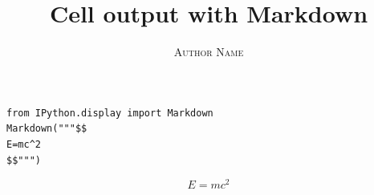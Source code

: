 \documentclass[a4paper,11pt,oneside]{book}
\title{\Huge \textbf{Cell output with Markdown}}
\author{\textsc{Author Name}}
\begin{document}
\sloppy

\frontmatter
\maketitle

\tableofcontents

\mainmatter

% 
% 

\begin{verbatim}
from IPython.display import Markdown
Markdown("""$$
E=mc^2
$$""")
\end{verbatim}

\begin{equation}
E=mc^2
\end{equation}
\end{document}
